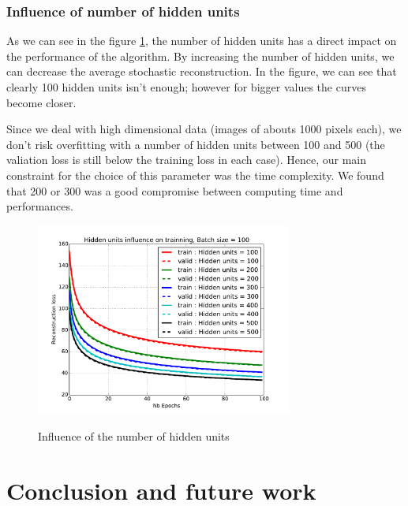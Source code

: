 \documentclass{article}
\begin{document}
\subsubsection{Influence of number of hidden units}

As we can see in the figure \ref{fig:hidden}, the number of hidden units has a direct impact on the performance of the algorithm. By increasing the number of hidden units, we can decrease the average stochastic reconstruction. In the figure, we can see that clearly 100 hidden units isn't enough; however for bigger values the curves become closer. 

Since we deal with high dimensional data (images of abouts 1000 pixels each), we don't risk overfitting with a number of hidden units between 100 and 500 (the valiation loss is still below the training loss in each case). Hence, our main constraint for the choice of this parameter was the time complexity. We found that 200 or 300 was a good compromise between computing time and performances.

\begin{figure}
\centering
\includegraphics[width=0.75\textwidth]{hidden_units}
\label{fig:hidden}
\caption{Influence of the number of hidden units}
\end{figure}



\clearpage
\section{Conclusion and future work}



\clearpage
\nocite{*}


\end{document}
